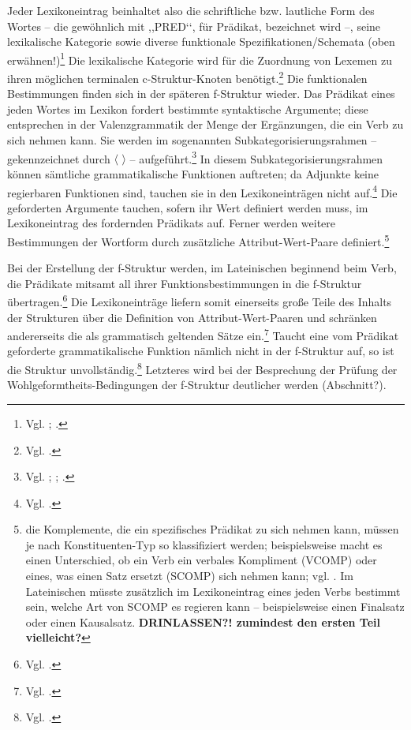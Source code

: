 \documentclass[12pt,a4paper]{article}
\begin{document}
Jeder Lexikoneintrag beinhaltet also die schriftliche bzw. lautliche Form des Wortes -- die gewöhnlich mit ,,PRED‘‘, für Prädikat, bezeichnet wird --, seine lexikalische Kategorie sowie diverse funktionale Spezifikationen/Schemata (oben erwähnen!)\footnote{Vgl. \cite[27; 33]{Rohrer}; \cite[16]{Skript}.} Die lexikalische Kategorie wird für die Zuordnung von Lexemen zu ihren möglichen terminalen c-Struktur-Knoten benötigt.\footnote{Vgl. \cite[63]{Skript}.} Die funktionalen Bestimmungen finden sich in der späteren f-Struktur wieder. Das Prädikat eines jeden Wortes im Lexikon fordert bestimmte syntaktische Argumente; diese entsprechen in der Valenzgrammatik der Menge der Ergänzungen, die ein Verb zu sich nehmen kann. Sie werden im sogenannten Subkategorisierungsrahmen -- gekennzeichnet durch $\langle$ $\rangle$ -- aufgeführt.\footnote{Vgl. \cite[7]{Dal}; \cite[70]{Skript}; \cite[27]{Rohrer}.} In diesem Subkategorisierungsrahmen können sämtliche grammatikalische Funktionen auftreten; da Adjunkte keine regierbaren Funktionen sind, tauchen sie in den Lexikoneinträgen nicht auf.\footnote{Vgl. \cite[27]{Rohrer}.} Die geforderten Argumente tauchen, sofern ihr Wert definiert werden muss, im Lexikoneintrag des fordernden Prädikats auf. Ferner werden weitere Bestimmungen der Wortform durch zusätzliche Attribut-Wert-Paare definiert.\footnote{die Komplemente, die ein spezifisches Prädikat zu sich nehmen kann, müssen je nach Konstituenten-Typ so klassifiziert werden; beispielsweise macht es einen Unterschied, ob ein Verb ein verbales Kompliment (VCOMP) oder eines, was einen Satz ersetzt (SCOMP) sich nehmen kann; vgl. \cite[22]{Rohrer}. Im Lateinischen müsste zusätzlich im Lexikoneintrag eines jeden Verbs bestimmt sein, welche Art von SCOMP es regieren kann -- beispielsweise einen Finalsatz oder einen Kausalsatz. \textbf{DRINLASSEN?! zumindest den ersten Teil vielleicht?}}

Bei der Erstellung der f-Struktur werden, im Lateinischen beginnend beim Verb, die Prädikate mitsamt all ihrer Funktionsbestimmungen in die f-Struktur übertragen.\footnote{Vgl. \cite[28]{Rohrer}.} Die Lexikoneinträge liefern somit einerseits große Teile des Inhalts der Strukturen über die Definition von Attribut-Wert-Paaren und schränken andererseits die als grammatisch geltenden Sätze ein.\footnote{Vgl. \cite[63]{Skript}.}  Taucht eine vom Prädikat geforderte grammatikalische Funktion nämlich nicht in der f-Struktur auf, so ist die Struktur unvollständig.\footnote{Vgl. \cite[28]{Rohrer}.} Letzteres wird bei der Besprechung der Prüfung der Wohlgeformtheits-Bedingungen der f-Struktur deutlicher werden (Abschnitt?).
\end{document}
